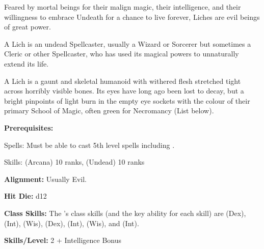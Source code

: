 
Feared by mortal beings for their malign magic, their intelligence, and their willingness to embrace Undeath for a chance to live forever, Liches are evil beings of great power.

A Lich is an undead Spellcaster, usually a Wizard or Sorcerer but sometimes a Cleric or other Spellcaster, who has used its magical powers to unnaturally extend its life.

A Lich is a gaunt and skeletal humanoid with withered flesh stretched tight across horribly visible bones. Its eyes have long ago been lost to decay, but a bright pinpoints of light burn in the empty eye sockets with the colour of their primary School of Magic, often green for Necromancy (List below).

\textbf{Prerequisites:} 
\begin{description*}
\item[\hspace*{1.5cm}Spells:] Must be able to cast 5th level spells including .
\item[\hspace*{1.5cm}Skills:]  (Arcana) 10 ranks,  (Undead) 10 ranks
\end{description*}

\textbf{Alignment:} Usually Evil.

\textbf{Hit Die:} d12

\textbf{Class Skills:} The \currentclassname{}'s class skills (and the key ability for each skill) are  (Dex),  (Int),  (Wis),  (Dex),  (Int),  (Wis), and  (Int).

\textbf{Skills/Level:} 2 + Intelligence Bonus

\poorbab{}
\goodfor{}
\poorref{}
\goodwil{}

